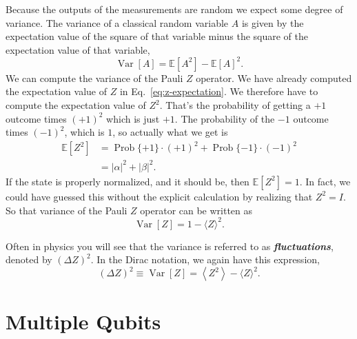 Because the outputs of the measurements are random we expect some degree of variance. The variance of a classical random variable $A$ is given by the expectation value of the square of that variable minus the square of the expectation value of that variable,
\begin{equation}
    \operatorname{Var}[A] =\mathbb{E}\left[A^{2}\right]-\mathbb{E}[A]^{2}.
\end{equation}
We can compute the variance of the Pauli $Z$ operator.
We have already computed the expectation value of $Z$ in Eq.~\ref{eq:z-expectation}. We therefore have to compute the expectation value of $Z^2$. That's the probability of getting a $+1$ outcome times $(+1)^2$ which is just $+1$.  The probability of the $-1$ outcome times $(-1)^2$, which is $1$, so actually what we get is
\begin{equation}
\begin{aligned}
    \mathbb{E}\left[Z^{2}\right] &=\operatorname{Prob}\{+1\} \cdot(+1)^{2}+\operatorname{Prob}\{-1\} \cdot(-1)^{2} \\
    &=|\alpha|^{2}+|\beta|^{2}.
\end{aligned}
\end{equation}
If the state is properly normalized, and it should be, then $\mathbb{E}[Z^{2}]=1$.
In fact, we could have guessed this without the explicit calculation by realizing that $Z^2=I$.
So that variance of the Pauli $Z$ operator can be written as
\begin{equation}
    \operatorname{Var}[Z] = 1 - \langle Z \rangle^2.
\end{equation}

Often in physics you will see that the variance is referred to as \textbf{\emph{fluctuations}}, denoted by $(\Delta Z)^2$. In the Dirac notation, we again have this expression,
\begin{equation}
    (\Delta Z)^{2} \equiv \operatorname{Var}[Z] = \left\langle Z^{2}\right\rangle-\langle Z\rangle^{2}.
\end{equation}





\section{Multiple Qubits}
\label{sec:multi-qubit}

